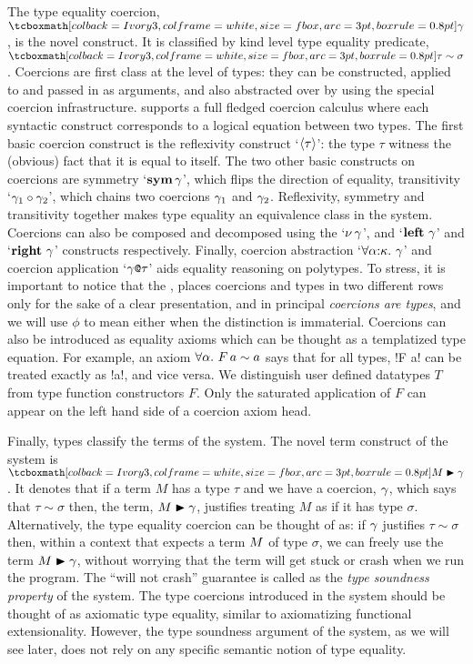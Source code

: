 \documentclass[screen,nonacm,manuscript,review]{acmart} %
\begin{document}
The type equality coercion, $\shl{\Co}$, is the novel construct.
It is classified by kind level type equality predicate,
$\shl{\tau\sim\sigma}$. Coercions are first class at the level of types:
they can be constructed, applied to and passed in as arguments, and also
abstracted over by using the special coercion infrastructure.
\SFC supports a full fledged coercion calculus where
each syntactic construct corresponds to a logical equation between two
types. The first basic coercion construct is the
reflexivity construct `$\langle{\tau}\rangle$': the type $\tau$
witness the (obvious) fact that it is equal to itself. The two other
basic constructs on coercions are symmetry `$\textbf{sym}\,{\gamma}$', which flips
the direction of equality, transitivity `${\gamma_1} \circ {\gamma_2}$',
which chains two coercions $\gamma_1$ and $\gamma_2$. Reflexivity, symmetry
and transitivity together makes type equality an equivalence class in the
system. Coercions can also be composed and decomposed using the
`$\nu\,\gamma$', and `$\textbf{left}~\gamma$' and `$\textbf{right}~\gamma$' constructs
respectively. Finally, coercion abstraction `$\forall\alpha{:}\kappa.~\gamma$' and coercion application `$\gamma\texttt{@}\tau$' aids
equality reasoning on polytypes. To stress, it is important to notice
that the , places coercions and types in two
different rows only for the sake of a clear presentation, and in
principal \emph{coercions are types}, and we will use $\phi$ to mean
either when the distinction is immaterial. Coercions can also
be introduced as equality axioms which can be thought as a templatized type
equation. For example, an axiom $\forall\alpha.~F\, a \sim a$
says that for all types, !F a! can be treated exactly as !a!, and vice
versa. We distinguish user defined datatypes $T$ from type function constructors
$F$. Only the saturated application of $F$ can appear on the left hand
side of a coercion axiom head.

Finally, types classify the terms of the system.
The novel term construct of the system is $\shl{\Cast \Tm \Co}$.
It denotes that if a term $M$ has a type $\tau$
and we have a coercion, $\gamma$, which says that $\tau\sim\sigma$
then, the term, $M\mathrel{\blacktriangleright}\gamma$, justifies treating $M$ as if it has type
$\sigma$. Alternatively, the type equality coercion can be thought of
as: if $\gamma$ justifies $\tau \sim \sigma$ then, within a context that
expects a term $M$ of type $\sigma$, we can freely use the term $M\mathrel{\blacktriangleright}\gamma$,
without worrying that the term will get stuck or crash when we run the
program. The ``will not crash'' guarantee is called as the \emph{type
  soundness property} of the system.
The type coercions introduced in the system should be
thought of as axiomatic type equality, similar to axiomatizing functional
extensionality. However, the type soundness argument of the system, as we
will see later, does not rely on any specific
semantic notion of type equality.
\end{document}
